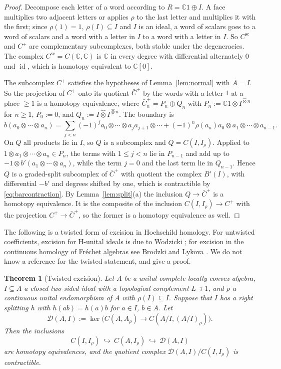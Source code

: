 \documentclass[11pt]{amsart}
\newtheorem{theorem}{Theorem}[section]
\theoremstyle{definition}
\theoremstyle{remark}
\newcommand{\C}{\mathbb C}
\newcommand{\id}{\operatorname{id}}
\begin{document}
\begin{proof}
Decompose each letter of a word according to $R=\C1\oplus I$.  A face
multiplies two adjacent letters or applies $\rho$ to the last letter and
multiplies it with the first; since $\rho(1)=1$, $\rho(I)\subseteq I$ and
$I$ is an ideal, a word of scalars goes to a word of scalars and a word with a
letter in $I$ to a word with a letter in $I$.  So $C^{\mathrm{sc}}$ and
$C^{+}$ are complementary subcomplexes, both stable under the degeneracies.
The complex $C^{\mathrm{sc}}=C(\C,\C)$ is $\C$ in every degree with
differential alternately $0$ and $\id$, which is homotopy equivalent to
$\C[0]$.

The subcomplex $C^{+}$ satisfies the hypotheses of Lemma~\ref{lem:normal}
with $\bar A=I$.  So the projection of $C^{+}$ onto its quotient $\bar C^{+}$
by the words with a letter $1$ at a place $\ge1$ is a homotopy equivalence,
where $\bar C^{+}_n=P_n\oplus Q_n$ with $P_n:=\C1\otimes I^{\widehat\otimes n}$ for
$n\ge1$, $P_0:=0$, and $Q_n:=I\widehat\otimes I^{\widehat\otimes n}$.  The
boundary is
\[
b(a_0\otimes\cdots\otimes a_n)=\sum_{j<n}(-1)^{j}a_0\otimes\cdots\otimes
a_ja_{j+1}\otimes\cdots+(-1)^{n}\rho(a_n)a_0\otimes a_1\otimes\cdots\otimes
a_{n-1}.
\]
On $Q$ all products lie in $I$, so $Q$ is a subcomplex and $Q=C(I,I_{\rho})$.
Applied to $1\otimes a_1\otimes\cdots\otimes a_n\in P_n$, the terms with
$1\le j<n$ lie in $P_{n-1}$ and add up to $-1\otimes b'(a_1\otimes\cdots\otimes
a_n)$, while the term $j=0$ and the last term lie in $Q_{n-1}$.  Hence $Q$ is a
graded-split subcomplex of $\bar C^{+}$ with quotient the complex $B'(I)$, with
differential $-b'$ and degrees shifted by one, which is contractible by
\eqref{eq:barcontraction}.  By Lemma~\ref{lem:split}(a) the inclusion
$Q\to\bar C^{+}$ is a homotopy equivalence.  It is the composite of the
inclusion $C(I,I_{\rho})\to C^{+}$ with the projection $C^{+}\to\bar C^{+}$,
so the former is a homotopy equivalence as well.
\end{proof}

The following is a twisted form of excision in Hochschild homology.  For
untwisted coefficients, excision for H-unital ideals is due to Wodzicki
\cite{Wodzicki}; for excision in the continuous homology of Fr\'echet
algebras see Brodzki and Lykova \cite{BrodzkiLykova}.  We do not know a
reference for the twisted statement, and give a proof.

\begin{theorem}[Twisted excision]\label{thm:excision-input}
Let $A$ be a unital complete locally convex algebra, $I\subseteq A$ a closed
two-sided ideal with a topological complement $L\ni1$, and $\rho$ a continuous
unital endomorphism of $A$ with $\rho(I)\subseteq I$.  Suppose that $I$ has a
right splitting $h$ with $h(ab)=h(a)b$ for $a\in I$, $b\in A$.  Let
\[
\mathcal D(A,I):=\ker\bigl(C(A,A_{\rho})\to C(A/I,(A/I)_{\rho})\bigr).
\]
Then the inclusions
\[
C(I,I_{\rho})\ \hookrightarrow\ C(A,I_{\rho})\ \hookrightarrow\ \mathcal D(A,I)
\]
are homotopy equivalences, and the quotient complex
$\mathcal D(A,I)/C(I,I_{\rho})$ is contractible.
\end{theorem}
\end{document}
